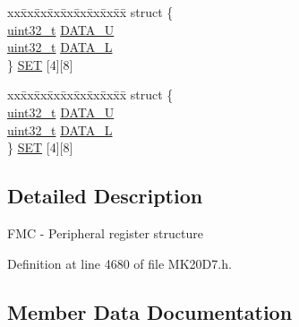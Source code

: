 \begin{DoxyCompactItemize}
\begin{tabbing}
\end{tabbing}\item 
\begin{tabbing}
xx\=xx\=xx\=xx\=xx\=xx\=xx\=xx\=xx\=\kill
struct \{\\
\>\hyperlink{_p_e___types_8h_a33594304e786b158f3fb30289278f5af}{uint32\_t} \hyperlink{struct_f_m_c___mem_map_acd323327704230c8d13c021730d39c15}{DATA\_U}\\
\>\hyperlink{_p_e___types_8h_a33594304e786b158f3fb30289278f5af}{uint32\_t} \hyperlink{struct_f_m_c___mem_map_a697bb0356541fe920260e33d29bf0698}{DATA\_L}\\
\} \hyperlink{struct_f_m_c___mem_map_a35571a66bfcd23043566e42a7f3dedf3}{SET} \mbox{[}4\mbox{]}\mbox{[}8\mbox{]}\\

\end{tabbing}\item 
\begin{tabbing}
xx\=xx\=xx\=xx\=xx\=xx\=xx\=xx\=xx\=\kill
struct \{\\
\>\hyperlink{_p_e___types_8h_a33594304e786b158f3fb30289278f5af}{uint32\_t} \hyperlink{struct_f_m_c___mem_map_acd323327704230c8d13c021730d39c15}{DATA\_U}\\
\>\hyperlink{_p_e___types_8h_a33594304e786b158f3fb30289278f5af}{uint32\_t} \hyperlink{struct_f_m_c___mem_map_a697bb0356541fe920260e33d29bf0698}{DATA\_L}\\
\} \hyperlink{struct_f_m_c___mem_map_ad953bb7a2bfb0c1a1d686a68b3755c9b}{SET} \mbox{[}4\mbox{]}\mbox{[}8\mbox{]}\\

\end{tabbing}\end{DoxyCompactItemize}


\subsection{Detailed Description}
F\+MC -\/ Peripheral register structure 

Definition at line 4680 of file M\+K20\+D7.\+h.



\subsection{Member Data Documentation}
